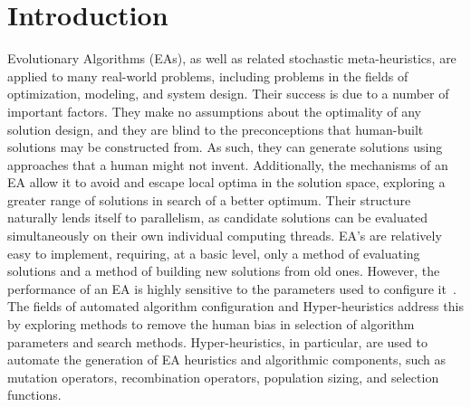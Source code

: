 \documentclass[sigconf]{acmart}
\begin{document}




\maketitle


\section{Introduction}
\label{Introduction}
Evolutionary Algorithms (EAs), as well as related stochastic meta-heuristics, are applied to many real-world problems, including problems in the fields of optimization, modeling, and system design. Their success is due to a number of important factors. They make no assumptions about the optimality of any solution design, and they are blind to the preconceptions that human-built solutions may be constructed from. As such, they can generate solutions using approaches that a human might not invent. Additionally, the mechanisms of an EA allow it to avoid and escape local optima in the solution space, exploring a greater range of solutions in search of a better optimum. Their structure naturally lends itself to parallelism, as candidate solutions can be evaluated simultaneously on their own individual computing threads. EA's are relatively easy to implement, requiring, at a basic level, only a method of evaluating solutions and a method of building new solutions from old ones. However, the performance of an EA is highly sensitive to the parameters used to configure it~\citep{eiben1999parameter}. The fields of automated algorithm configuration and Hyper-heuristics address this by exploring methods to remove the human bias in selection of algorithm parameters and search methods. Hyper-heuristics, in particular, are used to automate the generation of EA heuristics and algorithmic components, such as mutation operators, recombination operators, population sizing, and selection functions.
\end{document}
